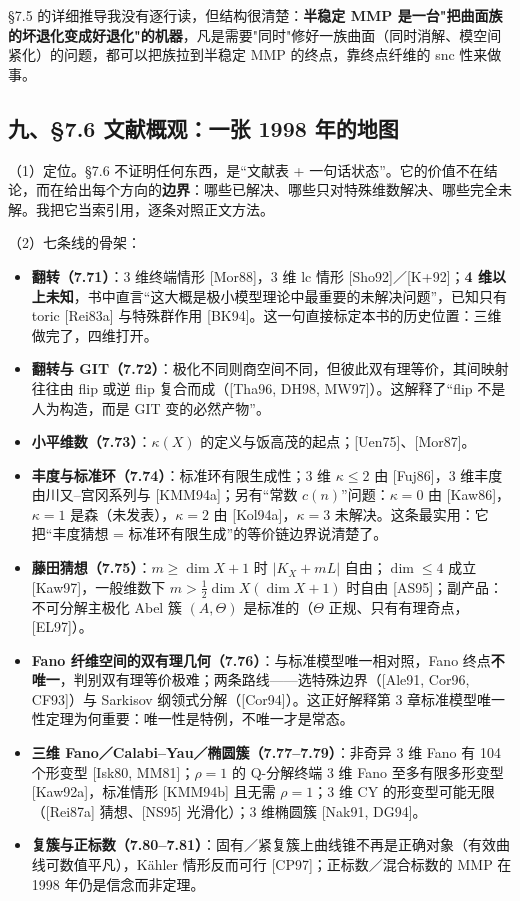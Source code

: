 \S7.5 的详细推导我没有逐行读，但结构很清楚：\textbf{半稳定 MMP 是一台"把曲面族的坏退化变成好退化"的机器}，凡是需要"同时"修好一族曲面（同时消解、模空间紧化）的问题，都可以把族拉到半稳定 MMP 的终点，靠终点纤维的 snc 性来做事。

\subsection*{九、\S7.6 文献概观：一张 1998 年的地图}

（1）定位。\S7.6 不证明任何东西，是“文献表 + 一句话状态”。它的价值不在结论，而在给出每个方向的\textbf{边界}：哪些已解决、哪些只对特殊维数解决、哪些完全未解。我把它当索引用，逐条对照正文方法。

（2）七条线的骨架：
\begin{itemize}
\item \textbf{翻转（7.71）}：3 维终端情形 [Mor88]，3 维 lc 情形 [Sho92]／[K+92]；\textbf{4 维以上未知}，书中直言“这大概是极小模型理论中最重要的未解决问题”，已知只有 toric [Rei83a] 与特殊群作用 [BK94]。这一句直接标定本书的历史位置：三维做完了，四维打开。
\item \textbf{翻转与 GIT（7.72）}：极化不同则商空间不同，但彼此双有理等价，其间映射往往由 flip 或逆 flip 复合而成（[Tha96, DH98, MW97]）。这解释了“flip 不是人为构造，而是 GIT 变的必然产物”。
\item \textbf{小平维数（7.73）}：$\kappa(X)$ 的定义与饭高茂的起点；[Uen75]、[Mor87]。
\item \textbf{丰度与标准环（7.74）}：标准环有限生成性；3 维 $\kappa\le2$ 由 [Fuj86]，3 维丰度由川又--宫冈系列与 [KMM94a]；另有“常数 $c(n)$”问题：$\kappa=0$ 由 [Kaw86]，$\kappa=1$ 是森（未发表），$\kappa=2$ 由 [Kol94a]，$\kappa=3$ 未解决。这条最实用：它把“丰度猜想 = 标准环有限生成”的等价链边界说清楚了。
\item \textbf{藤田猜想（7.75）}：$m\ge\dim X+1$ 时 $|K_X+mL|$ 自由；$\dim\le4$ 成立 [Kaw97]，一般维数下 $m>\frac12\dim X(\dim X+1)$ 时自由 [AS95]；副产品：不可分解主极化 Abel 簇 $(A,\Theta)$ 是标准的（$\Theta$ 正规、只有有理奇点，[EL97]）。
\item \textbf{Fano 纤维空间的双有理几何（7.76）}：与标准模型唯一相对照，Fano 终点\textbf{不唯一}，判别双有理等价极难；两条路线——选特殊边界（[Ale91, Cor96, CF93]）与 Sarkisov 纲领式分解（[Cor94]）。这正好解释第 3 章标准模型唯一性定理为何重要：唯一性是特例，不唯一才是常态。
\item \textbf{三维 Fano／Calabi--Yau／椭圆簇（7.77--7.79）}：非奇异 3 维 Fano 有 104 个形变型 [Isk80, MM81]；$\rho=1$ 的 Q-分解终端 3 维 Fano 至多有限多形变型 [Kaw92a]，标准情形 [KMM94b] 且无需 $\rho=1$；3 维 CY 的形变型可能无限（[Rei87a] 猜想、[NS95] 光滑化）；3 维椭圆簇 [Nak91, DG94]。
\item \textbf{复簇与正标数（7.80--7.81）}：固有／紧复簇上曲线锥不再是正确对象（有效曲线可数值平凡），Kähler 情形反而可行 [CP97]；正标数／混合标数的 MMP 在 1998 年仍是信念而非定理。
\end{itemize}

